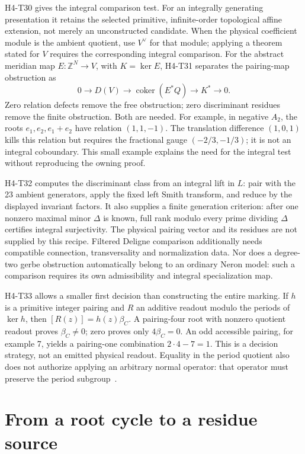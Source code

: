 \documentclass[11pt]{article}
\newcommand{\Z}{\mathbb{Z}}
\theoremstyle{definition}
\theoremstyle{remark}
\begin{document}
H4-T30 gives the integral comparison test. For an integrally generating
presentation it retains the selected primitive, infinite-order topological
affine extension, not merely an unconstructed candidate. When the physical
coefficient module is the ambient quotient, use \(V^\vee\) for that
module; applying a theorem stated for \(V\) requires the corresponding
integral comparison. For the abstract
meridian map \(E:\Z^N\to V\), with \(K=\ker E\), H4-T31 separates
the pairing-map obstruction as
\[
 0\longrightarrow D(V)\longrightarrow\operatorname{coker}(E^*Q)
   \longrightarrow K^*\longrightarrow0.
\]
Zero relation defects remove the free obstruction; zero discriminant
residues remove the finite obstruction. Both are needed. For example,
in negative \(A_2\), the roots \(e_1,e_2,e_1+e_2\) have relation
\((1,1,-1)\). The translation difference \((1,0,1)\) kills this
relation but requires the fractional gauge \((-2/3,-1/3)\); it is not an
integral coboundary. This small example explains the need for the integral
test without reproducing the owning proof.

H4-T32 computes the discriminant class from an integral lift in \(L\):
pair with the 23 ambient generators, apply the fixed left Smith transform,
and reduce by the displayed invariant factors. It also supplies a finite
generation criterion: after one nonzero maximal minor \(\Delta\) is known,
full rank modulo every prime dividing \(\Delta\) certifies integral
surjectivity. The physical pairing vector and its residues are not supplied
by this recipe. Filtered Deligne comparison additionally needs compatible
connection, transversality and normalization data. Nor does a degree-two
gerbe obstruction automatically belong to an ordinary Neron model: such a
comparison requires its own admissibility and integral specialization map.

H4-T33 allows a smaller first decision than constructing the entire
marking. If \(h\) is a primitive integer pairing and \(R\) an additive
readout modulo the periods of \(\ker h\), then
\([R(z)]=h(z)\beta_C\). A pairing-four root with nonzero quotient
readout proves \(\beta_C\neq0\); zero proves only
\(4\beta_C=0\). An odd accessible pairing, for example 7, yields a
pairing-one combination \(2\cdot4-7=1\). This is a decision strategy,
not an emitted physical readout. Equality in the period quotient also
does not authorize applying an arbitrary normal operator: that operator
must preserve the period subgroup~\cite{FluxIntegral}.

\section{From a root cycle to a residue source}
\label{sec:root-import}
\end{document}
